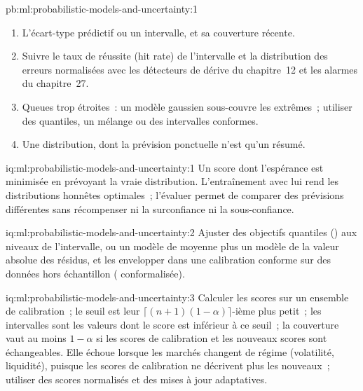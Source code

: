 \begin{solution}{pb:ml:probabilistic-models-and-uncertainty:1}
\begin{enumerate}
à 1.91 (1.93 avec la vraie variance)~; après le changement de régime, les intervalles conformes scindés couvrent 74.0~\% (brut) ou 86.9~\%
(normalisé) des 90~\% nominaux, la  adaptative 90.1~\%.
\item L'écart-type prédictif ou un intervalle, et sa couverture récente.
\item Suivre le taux de réussite (hit rate) de l'intervalle et la distribution des erreurs normalisées avec les détecteurs de dérive du chapitre~12 et les
alarmes du chapitre~27.
\item Queues trop étroites~: un modèle gaussien sous-couvre les extrêmes~; utiliser des quantiles, un mélange ou des intervalles conformes.
\item Une distribution, dont la prévision ponctuelle n'est qu'un résumé.
\end{enumerate}
\end{solution}

\begin{solution}{iq:ml:probabilistic-models-and-uncertainty:1}
Un score dont l'espérance est minimisée en prévoyant la vraie distribution. L'entraînement avec lui rend les distributions honnêtes
optimales~; l'évaluer permet de comparer des prévisions différentes sans récompenser
ni la surconfiance ni la sous-confiance.
\end{solution}

\begin{solution}{iq:ml:probabilistic-models-and-uncertainty:2}
Ajuster des objectifs quantiles () aux niveaux de l'intervalle, ou un modèle de moyenne plus un modèle de la valeur absolue des résidus,
et les envelopper dans une calibration conforme sur des données hors échantillon ( conformalisée).
\end{solution}

\begin{solution}{iq:ml:probabilistic-models-and-uncertainty:3}
Calculer les scores sur un ensemble de calibration~; le seuil est leur $\lceil(n+1)(1-\alpha)\rceil$-ième plus petit~; les intervalles sont les
valeurs dont le score est inférieur à ce seuil~; la couverture vaut au moins $1 - \alpha$ si les scores de calibration et les nouveaux scores sont échangeables. Elle
échoue lorsque les marchés changent de régime (volatilité, liquidité), puisque les scores de calibration ne décrivent plus les nouveaux~;
utiliser des scores normalisés et des mises à jour adaptatives.
\end{solution}

